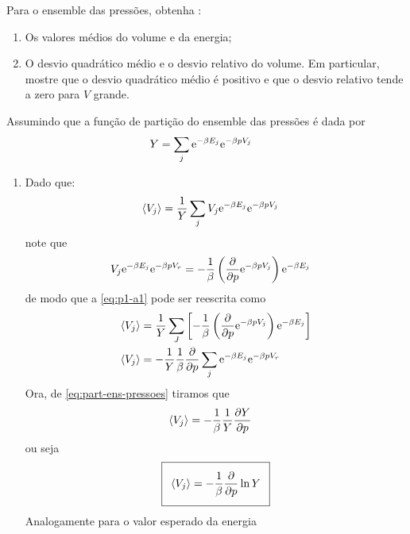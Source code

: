 \begin{prob}
  Para o ensemble das pressões, obtenha \cite[p.~161]{SALINAS:2001}:
  \begin{enumerate}[label=\alph *)]
    \item Os valores médios do volume e da energia;
    \item O desvio quadrático médio e o desvio relativo do volume. Em particular, mostre que o desvio quadrático médio é positivo e que o desvio relativo tende a zero para $V$ grande.
  \end{enumerate}
  \begin{sol}
    Assumindo que a função de partição do ensemble das pressões é dada por
    \begin{align}
      \label{eq:part-ens-pressoes}
      Y&=\sum_j\mathrm{e}^{-\beta E_j}\mathrm{e}^{-\beta pV_j}
    \end{align}
    \begin{enumerate}[label=\alph *)]
      \item Dado que:
      \begin{align}
        \label{eq:p1-a1}
       \langle V_j\rangle &=\frac{1}{Y}\sum_jV_j\mathrm{e}^{-\beta E_j}\mathrm{e}^{-\beta pV_j}
      \end{align}
      note que
      \begin{align}
        \label{eq:artificio-1a}
        V_j\mathrm{e}^{-\beta E_j}\mathrm{e}^{-\beta pV_r}&=-\frac{1}{\beta}\left(\frac{\partial {}}{\partial {p}}\mathrm{e}^{-\beta pV_j}\right)\mathrm{e}^{-\beta E_j}
      \end{align}
      de modo que a \eqref{eq:p1-a1} pode ser reescrita como
      \begin{align}
        \langle V_j \rangle&=\frac{1}{Y}\sum_J\left[-\frac{1}{\beta}\left(\frac{\partial {}}{\partial {p}}\mathrm{e}^{-\beta pV_j}\right)\mathrm{e}^{-\beta E_j}\right]\\
        \langle V_j \rangle&=-\frac{1}{Y}\frac{1}{\beta}\frac{\partial {}}{\partial {p}}\sum_j\mathrm{e}^{-\beta E_j}\mathrm{e}^{-\beta pV_r}
      \end{align}
      Ora, de \eqref{eq:part-ens-pressoes} tiramos que
      \begin{align}
        \begin{split}
          \langle V_j \rangle&=-\frac{1}{\beta}\frac{1}{Y}\frac{\partial {Y}}{\partial {p}}
        \end{split}
      \end{align}
      ou seja
      \begin{align}
        \label{eq:valor-medio-volume}
        \addtolength{\fboxsep}{5pt}
        \boxed{
          \begin{gathered}
            \langle V_j \rangle=-\frac{1}{\beta}\parder{}{p}\ln Y
          \end{gathered}
        }
      \end{align}
      Analogamente para o valor esperado da energia


\end{enumerate}
\end{sol}
\end{prob}

